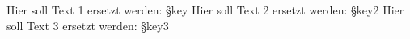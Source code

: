 \documentclass{article}
\begin{document}
    Hier soll Text 1 ersetzt werden: §{key}
    Hier soll Text 2 ersetzt werden: §{key2}
    Hier soll Text 3 ersetzt werden: §{key3}
\end{document}
